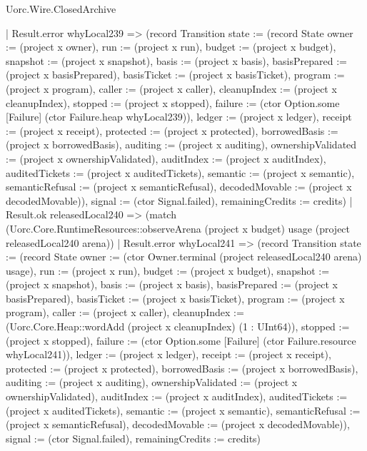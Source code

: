 \begin{lexlean}{Uorc.Wire.ClosedArchive}
\begin{semanticmodule}
{    | Result.error whyLocal239 => (record Transition {state := (record State {owner := (project x owner), run := (project x run), budget := (project x budget), snapshot := (project x snapshot), basis := (project x basis), basisPrepared := (project x basisPrepared), basisTicket := (project x basisTicket), program := (project x program), caller := (project x caller), cleanupIndex := (project x cleanupIndex), stopped := (project x stopped), failure := (ctor Option.some [Failure] (ctor Failure.heap whyLocal239)), ledger := (project x ledger), receipt := (project x receipt), protected := (project x protected), borrowedBasis := (project x borrowedBasis), auditing := (project x auditing), ownershipValidated := (project x ownershipValidated), auditIndex := (project x auditIndex), auditedTickets := (project x auditedTickets), semantic := (project x semantic), semanticRefusal := (project x semanticRefusal), decodedMovable := (project x decodedMovable)}), signal := (ctor Signal.failed), remainingCredits := credits})
    | Result.ok releasedLocal240 => (match (Uorc.Core.RuntimeResources::observeArena (project x budget) usage (project releasedLocal240 arena))
      | Result.error whyLocal241 => (record Transition {state := (record State {owner := (ctor Owner.terminal (project releasedLocal240 arena) usage), run := (project x run), budget := (project x budget), snapshot := (project x snapshot), basis := (project x basis), basisPrepared := (project x basisPrepared), basisTicket := (project x basisTicket), program := (project x program), caller := (project x caller), cleanupIndex := (Uorc.Core.Heap::wordAdd (project x cleanupIndex) (1 : UInt64)), stopped := (project x stopped), failure := (ctor Option.some [Failure] (ctor Failure.resource whyLocal241)), ledger := (project x ledger), receipt := (project x receipt), protected := (project x protected), borrowedBasis := (project x borrowedBasis), auditing := (project x auditing), ownershipValidated := (project x ownershipValidated), auditIndex := (project x auditIndex), auditedTickets := (project x auditedTickets), semantic := (project x semantic), semanticRefusal := (project x semanticRefusal), decodedMovable := (project x decodedMovable)}), signal := (ctor Signal.failed), remainingCredits := credits})
}
\end{semanticmodule}
\end{lexlean}
